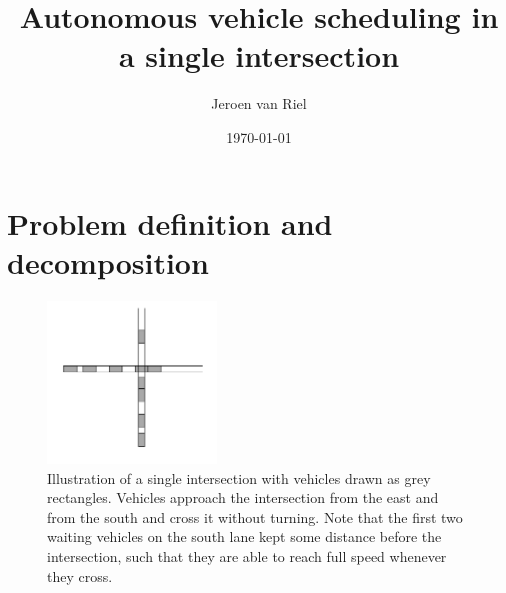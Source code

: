 \documentclass[a4paper]{article}
\author{Jeroen van Riel}
\date{\monthyeardate\today}
\title{Autonomous vehicle scheduling in a single intersection}
\theoremstyle{definition}
\theoremstyle{plain}
\begin{document}
\maketitle

\tableofcontents
\section{Problem definition and decomposition}

\begin{figure}
  \centering
  \includegraphics[width=0.4\textwidth]{figures/single/single_intersection_example.png}
  \caption{Illustration of a single intersection with vehicles drawn as grey
    rectangles. Vehicles approach the intersection from the east and from the
    south and cross it without turning. Note that the first two waiting vehicles
    on the south lane kept some distance before the intersection, such that they
    are able to reach full speed whenever they
    cross.}\label{fig:intersection_illustration}
\end{figure}
\end{document}
